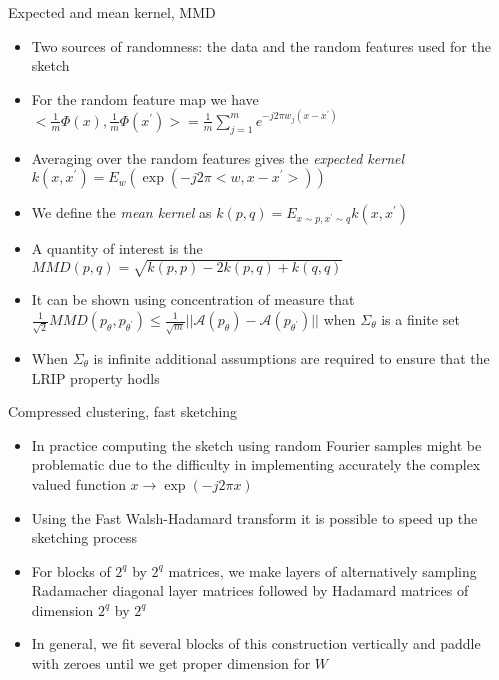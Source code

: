 \begin{frame}{Expected and mean kernel, MMD}
\begin{itemize}
    \item Two sources of randomness: the data and the random features used for the sketch
    \item For the random feature map we have $<\frac{1}{m}\Phi(x),\frac{1}{m}\Phi(x^{'})>=\frac{1}{m}\sum_{j=1}^m e^{-j2\pi w_j(x-x^{'})}$
    \item Averaging over the random features gives the \emph{expected kernel} $k(x,x^{'})=E_w(\exp(-j2\pi<w,x-x^{'}>))$
    \item We define the \emph{mean kernel} as
    $k(p,q)=E_{x\sim p, x^{'}\sim q} k(x,x^{'})$
    \item A quantity of interest is the   $MMD(p,q)=\sqrt{k(p,p)-2k(p,q)+k(q,q)}$
    \item It can be shown using concentration of measure that
     $\frac{1}{\sqrt{2}}MMD(p_{\theta},p_{\theta^{'}})\leq \frac{1}{\sqrt{m}}||\mathcal{A}(p_{\theta})-\mathcal{A}(p_{\theta^{'}})||$ when $\Sigma_{\theta}$ is a finite set
     \item When $\Sigma_{\theta}$ is infinite additional assumptions are required to ensure that the LRIP property hodls
\end{itemize}

\end{frame}

\begin{frame}{Compressed clustering, fast sketching}
\begin{itemize}
    \item In practice computing the sketch using random Fourier samples might be problematic due to the difficulty in implementing accurately the complex valued function $x\rightarrow\exp(-j2\pi x)$
    \item Using the Fast Walsh-Hadamard transform it is possible to speed up the sketching process
    \item For blocks of $2^q$ by $2^q$ matrices, we make layers of alternatively sampling Radamacher diagonal layer matrices
    followed by Hadamard matrices of dimension $2^q$ by $2^q$
    \item In general, we fit several blocks of this construction vertically and paddle with zeroes until we get proper dimension for $W$
\end{itemize}

\end{frame}




